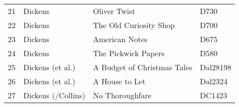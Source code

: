 \documentclass[a4paper,10pt,twoside,fleqn]{article}
\begin{document}
\begin{table}[h!]
{\begin{tabular}{c l l l}
21		& Dickens		& Oliver Twist				& D730        \\
22		& Dickens		&The Old Curiosity Shop			& D700         \\
23		& Dickens		& American Notes			& D675         \\
24		& Dickens		&The Pickwick Papers			& D580           \\
25		& Dickens     (et al.)  & A Budget of Christmas Tales		& Dal28198         \\
26		& Dickens (et al.)	& A House to Let			& Dal2324     \\
27		& Dickens (/Collins)     & No Thoroughfare			& DC1423       \\ \bottomrule
\end{tabular}
}
\end{table}
\end{document}
